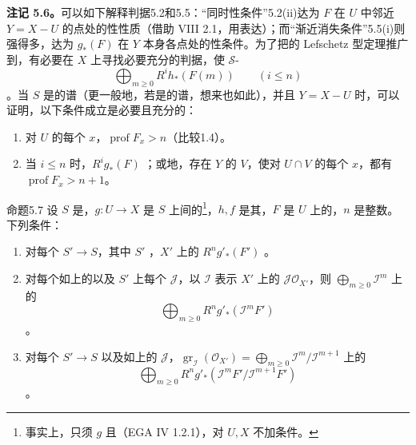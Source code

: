 \textbf{注记 5.6。}可以如下解释判据5.2和5.5：“同时性条件”5.2(ii)达为 $F$ 在 $U$ 中邻近 $Y=X-U$ 的点处的性性质（借助 VIII 2.1，用表达）；而“渐近消失条件”5.5(i)则强得多，达为 $g_*(F)$ 在 $Y$ 本身各点处的性条件。为了把的 Lefschetz 型定理推广到，有必要在 $X$ 上寻找必要充分的判据，使 $\mathscr S$-
\[
 \bigoplus_{m\geq0}R^ih_*(F(m))\qquad(i\leq n)
\]
。当 $S$ 是的谱（更一般地，若是的谱，想来也如此），并且 $Y=X-U$ 时，可以证明，以下条件成立是必要且充分的：
\begin{enumerate}
\item[$1^\circ$)] 对 $U$ 的每个 $x$，$\operatorname{prof}F_x>n$（比较1.4）。
\item[$2^\circ$)] 当 $i\leq n$ 时，$R^ig_*(F)$ ；或地，存在 $Y$ 的 $V$，使对 $U\cap V$ 的每个 $x$，都有 $\operatorname{prof}F_x>n+1$。
\end{enumerate}
\begin{SGAresult}{命题}{5.7}
设 $S$ 是，$g:U\to X$ 是 $S$ 上间的\footnote{事实上，只须 $g$ 且（EGA IV 1.2.1），对 $U,X$ 不加条件。}，$h,f$ 是其，$F$ 是 $U$ 上的，$n$ 是整数。下列条件：
\begin{enumerate}
\item[(i)] 对每个 $S'\to S$，其中 $S'$ ，$X'$ 上的 $R^ng'_*(F')$ 。
\item[(ii)] 对每个如上的以及 $S'$ 上每个 $\mathcal J$，以 $\mathcal I$ 表示 $X'$ 上的 $\mathcal J\mathcal O_{X'}$，则 $\bigoplus_{m\geq0}\mathcal I^m$ 上的
\[
 \bigoplus_{m\geq0}R^ng'_*(\mathcal I^mF')
\]
。
\item[(iii)] 对每个 $S'\to S$ 以及如上的 $\mathcal J$，$\operatorname{gr}_{\mathcal I}(\mathcal O_{X'})=\bigoplus_{m\geq0}\mathcal I^m/\mathcal I^{m+1}$ 上的
\[
 \bigoplus_{m\geq0}R^ng'_*(\mathcal I^mF'/\mathcal I^{m+1}F')
\]
。
\end{enumerate}
\end{SGAresult}

